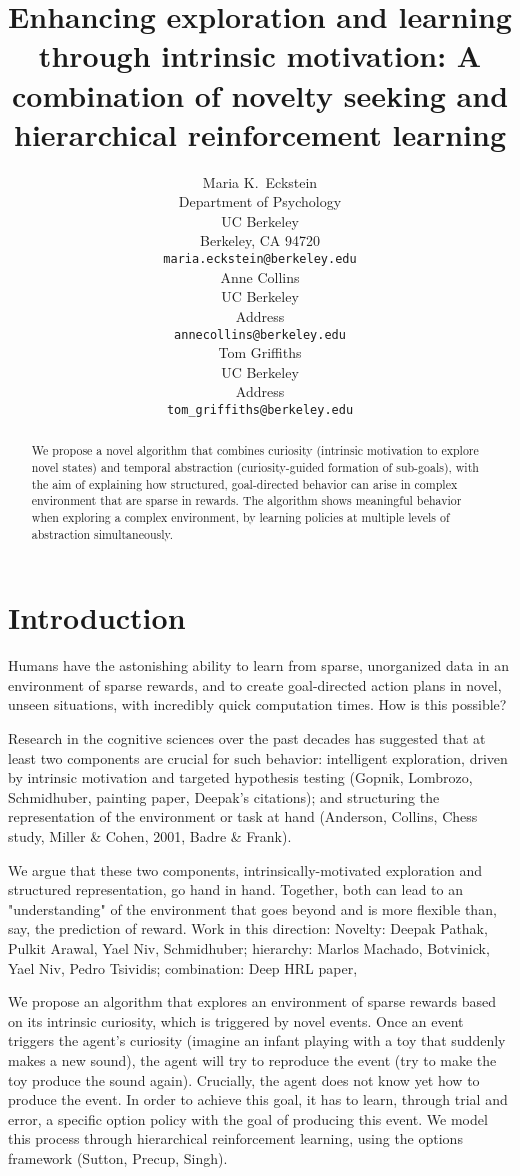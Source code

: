 \documentclass{article}
\title{Enhancing exploration and learning through intrinsic motivation: A combination of novelty seeking and hierarchical reinforcement learning}
\author{
  Maria K.~Eckstein \\
  Department of Psychology \\
  UC Berkeley \\
  Berkeley, CA 94720 \\
  \texttt{maria.eckstein@berkeley.edu} \\  
  \And
  Anne Collins \\
  UC Berkeley \\
  Address \\
  \texttt{annecollins@berkeley.edu} \\
  \And
  Tom Griffiths \\
  UC Berkeley \\
  Address \\
  \texttt{tom_griffiths@berkeley.edu} \\
}
\begin{document}
\maketitle

\begin{abstract}
  We propose a novel algorithm that combines curiosity (intrinsic motivation to explore novel states) and temporal abstraction (curiosity-guided formation of sub-goals), with the aim of explaining how structured, goal-directed behavior can arise in complex environment that are sparse in rewards. The algorithm shows meaningful behavior when exploring a complex environment, by learning policies at multiple levels of abstraction simultaneously. 
\end{abstract}


\section{Introduction}

Humans have the astonishing ability to learn from sparse, unorganized data in an environment of sparse rewards, and to create goal-directed action plans in novel, unseen situations, with incredibly quick computation times. How is this possible?

Research in the cognitive sciences over the past decades has suggested that at least two components are crucial for such behavior: intelligent exploration, driven by intrinsic motivation and targeted hypothesis testing (Gopnik, Lombrozo, Schmidhuber, painting paper, Deepak's citations); and structuring the representation of the environment or task at hand (Anderson, Collins, Chess study, Miller \& Cohen, 2001, Badre \& Frank).

We argue that these two components, intrinsically-motivated exploration and structured representation, go hand in hand. Together, both can lead to an "understanding" of the environment that goes beyond and is more flexible than, say, the prediction of reward. Work in this direction: Novelty: Deepak Pathak, Pulkit Arawal, Yael Niv, Schmidhuber; hierarchy: Marlos Machado, Botvinick, Yael Niv, Pedro Tsividis; combination: Deep HRL paper, 

We propose an algorithm that explores an environment of sparse rewards based on its intrinsic curiosity, which is triggered by novel events. Once an event triggers the agent's curiosity (imagine an infant playing with a toy that suddenly makes a new sound), the agent will try to reproduce the event (try to make the toy produce the sound again). Crucially, the agent does not know yet how to produce the event. In order to achieve this goal, it has to learn, through trial and error, a specific option policy with the goal of producing this event. We model this process through hierarchical reinforcement learning, using the options framework (Sutton, Precup, Singh).
\end{document}
